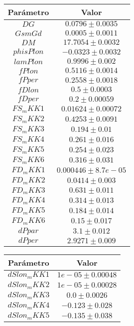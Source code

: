 \begin{table}[H]
\centering
\begin{multicols}{2}
\begin{tabular}{cc}
\toprule
Parámetro & Valor \\ \midrule
$DG        $&$ 0.0796 \pm 0.0035  $\\
$GsmGd     $&$ 0.0005 \pm 0.0011  $\\
$DM        $&$ 17.7054 \pm 0.0032 $\\
$phisPlon  $&$ -0.0323 \pm 0.0032 $\\
$lamPlon   $&$  0.9996 \pm 0.002  $\\
$fPlon     $&$ 0.5116 \pm 0.0014  $\\
$fPper     $&$ 0.2558 \pm 0.0018  $\\
$fDlon     $&$   0.5 \pm 0.0003   $\\
$fDper     $&$  0.2 \pm 0.00059   $\\
$FS_mKK1   $&$0.01624 \pm 0.00072 $\\
$FS_mKK2   $&$ 0.4253 \pm 0.0091  $\\
$FS_mKK3   $&$   0.194 \pm 0.01   $\\
$FS_mKK4   $&$  0.261 \pm 0.016   $\\
$FS_mKK5   $&$  0.254 \pm 0.023   $\\
$FS_mKK6   $&$  0.316 \pm 0.031   $\\
$FD_mKK1   $&$0.000446 \pm 8.7e-05$\\
$FD_mKK2   $&$  0.0414 \pm 0.003  $\\
$FD_mKK3   $&$  0.631 \pm 0.011   $\\
$FD_mKK4   $&$  0.314 \pm 0.013   $\\
$FD_mKK5   $&$  0.184 \pm 0.014   $\\
$FD_mKK6   $&$   0.15 \pm 0.017   $\\
$dPpar     $&$   3.1 \pm 0.012    $\\
$dPper     $&$  2.9271 \pm 0.009  $\\
\bottomrule
\end{tabular}
\begin{tabular}{cc}
\toprule
Parámetro & Valor \\ \midrule
$dSlon_mKK1$&$ 1e-05 \pm 0.00048  $\\
$dSlon_mKK2$&$ 1e-05 \pm 0.00028  $\\
$dSlon_mKK3$&$   0.0 \pm 0.0026   $\\
$dSlon_mKK4$&$  -0.123 \pm 0.028  $\\
$dSlon_mKK5$&$  -0.135 \pm 0.038  $\\

\end{tabular}
\end{multicols}
\end{table}
